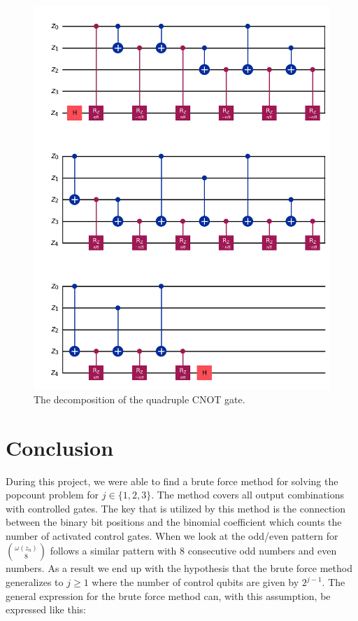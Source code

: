 \documentclass[12pt,a4paper]{article}
\begin{document}
\begin{figure}[htbp] 
    \centering \includegraphics[width=1\textwidth]{Figures/quad_cnot_decomposition.png} 
    \caption{The decomposition of the quadruple CNOT gate.} 
    \label{fig:quad_cnot_decomp} 
\end{figure}
\newpage
\section{Conclusion}
During this project, we were able to find a brute force method for solving the popcount problem for \(j \in \{1, 2, 3\}\). The method covers all output combinations with controlled gates. The key that is utilized by this method is the connection between the binary bit positions and the binomial coefficient which counts the number of activated control gates. When we look at the odd/even pattern for \(\binom{\omega(z_n)}{8}\) follows a similar pattern with 8 consecutive odd numbers and even numbers. As a result we end up with the hypothesis that the brute force method generalizes to \(j \ge 1\) where the number of control qubits are given by \(2^{j-1}\). The general expression for the brute force method can, with this assumption, be expressed like this:
\end{document}
